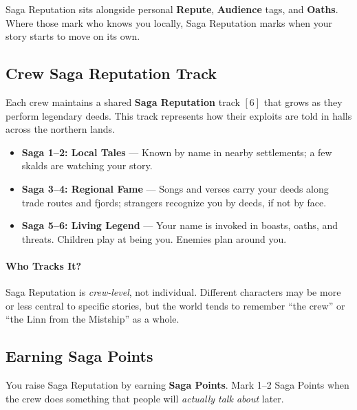 \documentclass[11pt]{article}
\begin{document}
Saga Reputation sits alongside personal \textbf{Repute}, \textbf{Audience} tags, and \textbf{Oaths}.
Where those mark who knows you locally, Saga Reputation marks when your story starts to move on
its own.

\subsection{Crew Saga Reputation Track}

Each crew maintains a shared \textbf{Saga Reputation} track \([6]\) that grows as they perform
legendary deeds. This track represents how their exploits are told in halls across the northern
lands.

\begin{itemize}
  \item \textbf{Saga 1--2: Local Tales} --- Known by name in nearby settlements; a few skalds are
        watching your story.
  \item \textbf{Saga 3--4: Regional Fame} --- Songs and verses carry your deeds along trade routes
        and fjords; strangers recognize you by deeds, if not by face.
  \item \textbf{Saga 5--6: Living Legend} --- Your name is invoked in boasts, oaths, and threats.
        Children play at being you. Enemies plan around you.
\end{itemize}

\paragraph*{Who Tracks It?}
Saga Reputation is \emph{crew-level}, not individual. Different characters may be more or less
central to specific stories, but the world tends to remember ``the crew'' or ``the Linn from the
Mistship'' as a whole.

\subsection{Earning Saga Points}

You raise Saga Reputation by earning \textbf{Saga Points}. Mark 1--2 Saga Points when the crew
does something that people will \emph{actually talk about} later.
\end{document}
